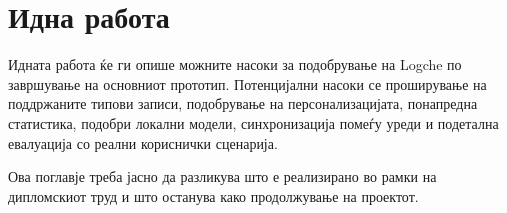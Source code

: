\chapter{Идна работа}

Идната работа ќе ги опише можните насоки за подобрување на Logche по завршување на основниот прототип.
Потенцијални насоки се проширување на поддржаните типови записи, подобрување на персонализацијата, понапредна статистика, подобри локални модели, синхронизација помеѓу уреди и подетална евалуација со реални кориснички сценарија.

Ова поглавје треба јасно да разликува што е реализирано во рамки на дипломскиот труд и што останува како продолжување на проектот.

